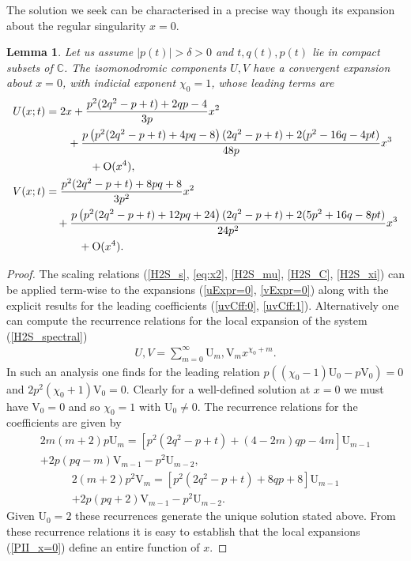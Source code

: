 \documentclass[10pt,reqno]{amsart}
\theoremstyle{plain}
\newtheorem{lemma}{Lemma}
\theoremstyle{definition}
\theoremstyle{remark}
\begin{document}
The solution we seek can be characterised in a precise way though its expansion about the regular
singularity $ x=0 $. 
\begin{lemma}
Let us assume $ |p(t)| > \delta > 0 $ and $ t, q(t), p(t) $ lie in compact subsets of $ {\mathbb C} $.
The isomonodromic components $ U, V $ have a convergent expansion about $ x=0 $, with indicial exponent $ \chi_0=1 $,
whose leading terms are 
\begin{align}
  U(x;t) & = 2x + \frac{p^2(2q^2-p+t)+2qp-4}{3p}x^2
\nonumber\\       & \qquad + \frac{p \left(p^2(2q^2-p+t)+4pq-8\right)(2q^2-p+t)+2(p^2-16q-4pt)}{48 p}x^3 
\nonumber\\       & \qquad\qquad+ {\rm O}(x^4) ,
\\
  V(x;t) & = \frac{p^2(2q^2-p+t)+8pq+8}{3p^2}x^2
\nonumber\\       & \quad + \frac{p\left(p^2(2q^2-p+t)+12pq+24\right)(2q^2-p+t)+2(5p^2+16q-8pt)}{24p^2}x^3
\nonumber\\       & \qquad\quad+ {\rm O}(x^4) .
\end{align}
\end{lemma}
\begin{proof}
The scaling relations (\ref{H2S_s}, \ref{eq:x2}, \ref{H2S_mu}, \ref{H2S_C}, \ref{H2S_xi}) can be applied
term-wise to the expansions (\ref{uExpr=0}, \ref{vExpr=0}) along with the explicit results for the leading
coefficients (\ref{uvCff:0}, \ref{uvCff:1}). Alternatively one can compute the recurrence relations for the
local expansion of the system (\ref{H2S_spectral}) 
\begin{gather}
  U, V = \sum_{m=0}^{\infty} \text{U}_{m},\text{V}_{m} x^{\chi_0+m} .
\label{PII_x=0}
\end{gather}
In such an analysis one finds for the leading relation
$ p\left((\chi_0-1)\text{U}_{0}-p\text{V}_{0}\right)=0 $ and $ 2p^2(\chi_0+1)\text{V}_{0}=0 $. Clearly
for a well-defined solution at $ x=0 $ we must have $ \text{V}_{0}=0 $ and so $ \chi_0=1 $ with 
$ \text{U}_{0}\neq 0 $. The recurrence relations for the coefficients are given by
\begin{multline}
 2m(m+2)p\text{U}_{m} = [ p^2(2q^2-p+t)+(4-2m)qp-4m ]\text{U}_{m-1}
\\           
  +2p(pq-m)\text{V}_{m-1}-p^2\text{U}_{m-2} ,
\label{UVrecur:a}
\end{multline}
\begin{multline}
 2(m+2)p^2\text{V}_{m} = [ p^2(2q^2-p+t)+8qp+8 ]\text{U}_{m-1}
\\
  +2p(pq+2)\text{V}_{m-1}-p^2\text{U}_{m-2} .
\label{UVrecur:b}
\end{multline}
Given $ \text{U}_{0}=2 $ these recurrences generate the unique solution stated above. From these
recurrence relations it is easy to establish that the local expansions (\ref{PII_x=0}) define an entire
function of $ x $.
\end{proof}
\end{document}
